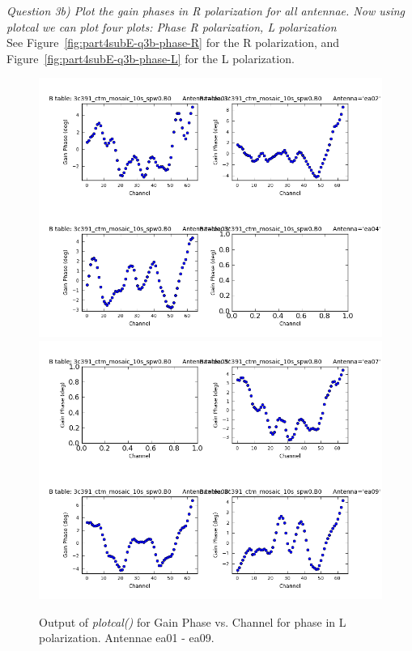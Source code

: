 \documentclass[12pt, a4paper]{article}
\begin{document}
\newpage


\noindent \textit{Question 3b) Plot the gain phases in R polarization for all antennae. Now using plotcal we can plot four plots: Phase R polarization, L polarization} \\
See Figure~\ref{fig:part4subE-q3b-phase-R} for the R polarization, and Figure~\ref{fig:part4subE-q3b-phase-L} for the L polarization. \\

\newpage
\begin{figure}[h!]
\centering
\includegraphics[scale=0.65]{../Imaging/plots2/part4-subE-question3b_phase_pol-L-ea01-ea04.png}
\includegraphics[scale=0.65]{../Imaging/plots2/part4-subE-question3b_phase_pol-L-ea05-ea09.png}
\caption{Output of \emph{plotcal()} for Gain Phase vs. Channel for phase in L polarization. Antennae ea01 - ea09.}
\end{figure}
\addtocounter{figure}{-1}
\end{document}
